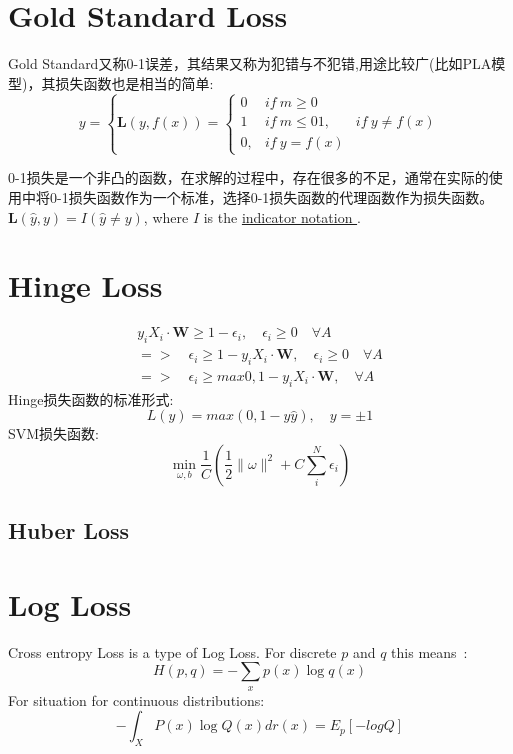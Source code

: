 \documentclass[hyperref, UTF-8]{ctexart}
\begin{document}
\section{Gold Standard Loss}
Gold Standard又称0-1误差，其结果又称为犯错与不犯错,用途比较广(比如PLA模型)，其损失函数也是相当的简单:
\begin{displaymath}
  y = \left \{
  \mathbf{L}(y, f(x)) = \left \{
      \begin{array}{ll}
        0 & if ~ m \geqslant 0  \\
        1 &  if ~ m \leqslant 0 
        1, & if ~ y\neq f(x) \\
        0, &  if ~ y = f(x) 
      \end{array}  \right.
\end{displaymath}

0-1损失是一个非凸的函数，在求解的过程中，存在很多的不足，通常在实际的使用中将0-1损失函数作为一个标准，选择0-1损失函数的代理函数作为损失函数。
$\mathbf{L}(\hat{y}, y) = \mathit{I}(\hat{y} \neq y)$, where $\mathit{I}$ is the
\href{https://en.wikipedia.org/wiki/Indicator_function}{ indicator notation }\cite{loss}.

\section{Hinge Loss}
\begin{eqnarray*}
  y_i X_i \cdot \mathbf{W} \geq 1 - \epsilon{_i}, \quad \epsilon_i \geq 0 \quad
  \forall{A}  \\
  => \quad \epsilon_i \geq 1 - y_iX_i\cdot \mathbf{W}, \quad \epsilon_i \geq 0
  \quad \forall{A}  \\
  => \quad \epsilon_i \geq max{0, 1-y_iX_i\cdot\mathbf{W}}, \quad \forall{A}
\end{eqnarray*}
Hinge损失函数的标准形式: 
\begin{displaymath}
  L(y)= max(0, 1-y\hat{y}),\quad y=\pm{1}
\end{displaymath}
SVM损失函数:
\begin{displaymath}
  \min_{\omega,b}\frac{1}{C}\left( \frac{1}{2} \parallel\omega\parallel^2 + C
  \sum_{i}^N \epsilon_i \right)
\end{displaymath}
\subsection{Huber Loss}


\section{Log Loss}
Cross entropy Loss is a type of Log Loss.
For discrete $\mathit{p}$ and $\mathit{q}$ this means~\cite{logloss}:
\begin{displaymath}
  H(p, q) = - \sum_{x}p(x)\log{ q(x) }
\end{displaymath}
For situation for continuous distributions:
\begin{displaymath}
  -\int_XP(x)\log{Q(x)} dr(x) = E_p[-logQ]
\end{displaymath}
\end{document}
